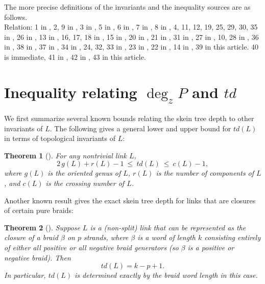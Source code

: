 \documentclass[pdftex, a4paper, 12pt, oneside]{amsart}
\numberwithin{equation}{section}
\theoremstyle{plain}
\newtheorem{theorem}{Theorem}[section]
\theoremstyle{definition}
\begin{document}
	
	\par 
	The more precise definitions of the invariants and the inequality sources are as follows.\\ 
	Relation:  
	{\color{red} 1} in \cite{Cro89},
	{\color{red} 2, 9} in \cite{Ada13},
	{\color{red} 3} in \cite{Jab20},
	{\color{red} 5} in \cite{KobKob96},
	{\color{red} 6} in \cite{Mor87},
	{\color{red} 7} in \cite{Mor86},
	{\color{red} 8} in \cite{Gil82},
	{\color{red} 4, 11, 12, 19, 25, 29, 30, 35} in \cite{Shi74},
	{\color{red} 26} in \cite{Han14},
	{\color{red} 13} in \cite{KauTay76},
	{\color{red} 16, 17, 18} in \cite{JMZ20},
	{\color{red} 15} in \cite{HNT90},
	{\color{red} 20} in \cite{Mcd19},
	{\color{red} 21} in \cite{LivMei15},
	{\color{red} 31} in \cite{OweStr16},
	{\color{red} 27} in \cite{SchTho89},
	{\color{red} 10, 28} in \cite{Hetal11},
	{\color{red} 36} in \cite{Jab23},
	{\color{red} 38} in \cite{LHLO14},
	{\color{red} 37} in \cite{MorBel98},
	{\color{red} 34} in \cite{BaePark00},
	{\color{red} 24, 32, 33} in \cite{Oza10},
	{\color{red} 23} in \cite{FW85, Mor86},
	{\color{red} 22} in \cite{Yam87},
	{\color{red} 14} in \cite{Ohy93},
	{\color{red} 39} in this article.
	{\color{red} 40} is immediate,
	{\color{red} 41} in \cite{Ras10},
	{\color{red} 42} in \cite{OzsSza03},
	{\color{red} 43} in this article.
	
	
	
	\section{Inequality relating $\deg_z P$ and $td$}\label{s4}
	We first summarize several known bounds relating the skein tree depth to other invariants of $L$. The following gives a general lower and upper bound for $td(L)$ in terms of topological invariants of $L$:
	
	\begin{theorem}[{\cite{Cro89,SchTho89}}]\label{thm:genus-crossing-bounds}
		For any nontrivial link $L$, 
		\[ 2\,g(L) + r(L) - 1 \ \le\ td(L)\ \le\ c(L) - 1, \] 
		where $g(L)$ is the oriented genus of $L$, $r(L)$ is the number of components of $L$, and $c(L)$ is the crossing number of $L$.
	\end{theorem}
	
	Another known result gives the exact skein tree depth for links that are closures of certain pure braids:
	
	\begin{theorem}[{\cite{KKO15}}]\label{thm:positive-braid}
		Suppose $L$ is a (non-split) link that can be represented as the closure of a braid $\beta$ on $p$ strands, where $\beta$ is a word of length $k$ consisting entirely of either all positive or all negative braid generators (so $\beta$ is a positive or negative braid). Then 
		\[ td(L) = k - p + 1.\] 
		In particular, $td(L)$ is determined exactly by the braid word length in this case.
	\end{theorem}
	
\end{document}
